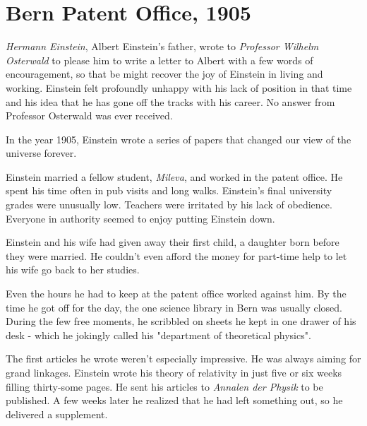 %

\section{Bern Patent Office, 1905}

\emph{Hermann Einstein}, Albert Einstein's father, wrote to \emph{Professor Wilhelm Osterwald} to please him to write a letter to Albert with a few words of encouragement, so that be might recover the joy of Einstein in living and working. Einstein felt profoundly unhappy with his lack of position in that time and his idea that he has gone off the tracks with his career. No answer from Professor Osterwald was ever received.

In the year 1905, Einstein wrote a series of papers that changed our view of the universe forever.

Einstein married a fellow student, \emph{Mileva}, and worked in the patent office. He spent his time often in pub visits and long walks. Einstein's final university grades were unusually low. Teachers were irritated by his lack of obedience. Everyone in authority seemed to enjoy putting Einstein down.

Einstein and his wife had given away their first child, a daughter born before they were married. He couldn't even afford the money for part-time help to let his wife go back to her studies.

Even the hours he had to keep at the patent office worked against him. By the time he got off for the day, the one science library in Bern was usually closed. During the few free moments, he scribbled on sheets he kept in one drawer of his desk - which he jokingly called his "department of theoretical physics".

The first articles he wrote weren't especially impressive. He was always aiming for grand linkages. Einstein wrote his theory of relativity in just five or six weeks filling thirty-some pages. He sent his articles to \emph{Annalen der Physik} to be published. A few weeks later he realized that he had left something out, so he delivered a supplement.